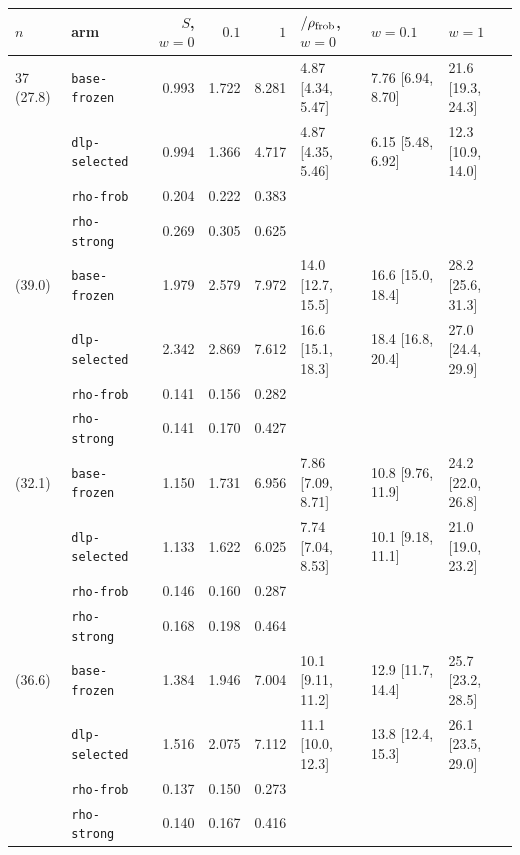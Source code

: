 \begin{tabular}{@{}llrrrlll@{}}
\toprule
$n$ & arm & $S$, $w=0$ & $0.1$ & $1$ & $/\rho_{\rm frob}$, $w=0$ & $w=0.1$ & $w=1$ \\
\midrule
37 (27.8) & \texttt{base-frozen} & 0.993 & 1.722 & 8.281 & 4.87 [4.34, 5.47] & 7.76 [6.94, 8.70] & 21.6 [19.3, 24.3] \\
 & \texttt{dlp-selected} & 0.994 & 1.366 & 4.717 & 4.87 [4.35, 5.46] & 6.15 [5.48, 6.92] & 12.3 [10.9, 14.0] \\
 & \texttt{rho-frob} & 0.204 & 0.222 & 0.383 &  &  &  \\
 & \texttt{rho-strong} & 0.269 & 0.305 & 0.625 &  &  &  \\
\addlinespace
41 (39.0) & \texttt{base-frozen} & 1.979 & 2.579 & 7.972 & 14.0 [12.7, 15.5] & 16.6 [15.0, 18.4] & 28.2 [25.6, 31.3] \\
 & \texttt{dlp-selected} & 2.342 & 2.869 & 7.612 & 16.6 [15.1, 18.3] & 18.4 [16.8, 20.4] & 27.0 [24.4, 29.9] \\
 & \texttt{rho-frob} & 0.141 & 0.156 & 0.282 &  &  &  \\
 & \texttt{rho-strong} & 0.141 & 0.170 & 0.427 &  &  &  \\
\addlinespace
43 (32.1) & \texttt{base-frozen} & 1.150 & 1.731 & 6.956 & 7.86 [7.09, 8.71] & 10.8 [9.76, 11.9] & 24.2 [22.0, 26.8] \\
 & \texttt{dlp-selected} & 1.133 & 1.622 & 6.025 & 7.74 [7.04, 8.53] & 10.1 [9.18, 11.1] & 21.0 [19.0, 23.2] \\
 & \texttt{rho-frob} & 0.146 & 0.160 & 0.287 &  &  &  \\
 & \texttt{rho-strong} & 0.168 & 0.198 & 0.464 &  &  &  \\
\addlinespace
47 (36.6) & \texttt{base-frozen} & 1.384 & 1.946 & 7.004 & 10.1 [9.11, 11.2] & 12.9 [11.7, 14.4] & 25.7 [23.2, 28.5] \\
 & \texttt{dlp-selected} & 1.516 & 2.075 & 7.112 & 11.1 [10.0, 12.3] & 13.8 [12.4, 15.3] & 26.1 [23.5, 29.0] \\
 & \texttt{rho-frob} & 0.137 & 0.150 & 0.273 &  &  &  \\
 & \texttt{rho-strong} & 0.140 & 0.167 & 0.416 &  &  &  \\
\bottomrule
\end{tabular}
